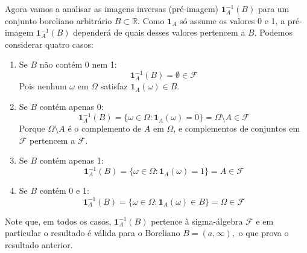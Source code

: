 \begin{frame}


 Agora vamos a analisar as imagens inversas {(pré-imagem)} \( \mathbf{1}_A^{-1}(B) \) para um conjunto boreliano arbitrário \( B \subset \mathbb{R} \). Como \( \mathbf{1}_A \) só assume os valores 0 e 1, a pré-imagem \( \mathbf{1}_A^{-1}(B) \) dependerá de quais desses valores pertencem a \( B \). Podemos considerar quatro casos:
\begin{enumerate}
\item Se \( B \) não contém 0 nem 1:
\[
\mathbf{1}_A^{-1}(B) = \emptyset \in \mathcal{F}
\]
Pois nenhum \( \omega \) em \( \Omega \) satisfaz \( \mathbf{1}_A(\omega) \in B \).

\item Se \( B \) contém apenas 0:
\[
\mathbf{1}_A^{-1}(B) = \{ \omega \in \Omega : \mathbf{1}_A(\omega) = 0 \} = \Omega \setminus A \in \mathcal{F}
\]
Porque \( \Omega \setminus A \) é o complemento de \( A \) em \( \Omega \), e complementos de conjuntos em \( \mathcal{F} \) pertencem a \( \mathcal{F} \).

\item Se \( B \) contém apenas 1:
\[
\mathbf{1}_A^{-1}(B) = \{ \omega \in \Omega : \mathbf{1}_A(\omega) = 1 \} = A \in \mathcal{F}
\]

\item Se \( B \) contém 0 e 1:
\[
\mathbf{1}_A^{-1}(B) = \{ \omega \in \Omega : \mathbf{1}_A(\omega) \in B \} = \Omega \in \mathcal{F}
\]
\end{enumerate}
Note que, em todos os casos, \( \mathbf{1}_A^{-1}(B) \) pertence à sigma-álgebra \( \mathcal{F} \) e em particular  o resultado  é válida para o Boreliano $B= \left( a,\infty \right),$  o que prova o resultado anterior.
	
\end{frame}	




%
%
